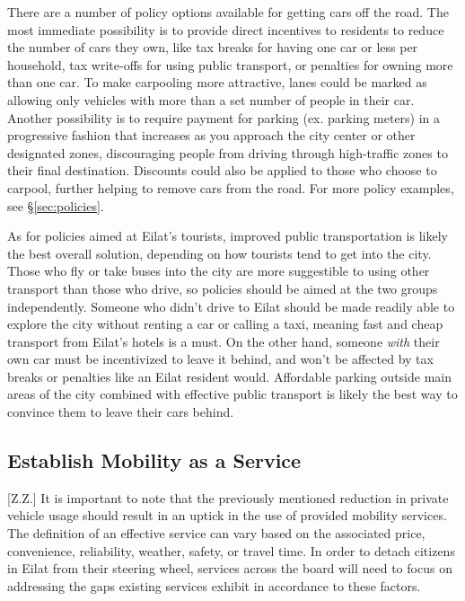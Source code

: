 \documentclass[12pt]{article}                       %
\begin{document}
There are a number of policy options available for getting cars off the road. The most immediate possibility is to provide direct incentives to residents to reduce the number of cars they own, like tax breaks for having one car or less per household, tax write-offs for using public transport, or penalties for owning more than one car. To make carpooling more attractive, lanes could be marked as allowing only vehicles with more than a set number of people in their car. Another possibility is to require payment for parking (ex. parking meters) in a progressive fashion that increases as you approach the city center or other designated zones, discouraging people from driving through high-traffic zones to their final destination. Discounts could also be applied to those who choose to carpool, further helping to remove cars from the road. For more policy examples, see \S\ref{sec:policies}.

As for policies aimed at Eilat's tourists, improved public transportation is likely the best overall solution, depending on how tourists tend to get into the city. Those who fly or take buses into the city are more suggestible to using other transport than those who drive, so policies should be aimed at the two groups independently. Someone who didn't drive to Eilat should be made readily able to explore the city without renting a car or calling a taxi, meaning fast and cheap transport from Eilat's hotels is a must. On the other hand, someone \textit{with} their own car must be incentivized to leave it behind, and won't be affected by tax breaks or penalties like an Eilat resident would. Affordable parking outside main areas of the city combined with effective public transport is likely the best way to convince them to leave their cars behind.

\subsection{Establish Mobility as a Service}[Z.Z.]    
It is important to note that the previously mentioned reduction in private vehicle usage should result in an uptick in the use of provided mobility services. The definition of an effective service can vary based on the associated price, convenience, reliability, weather, safety, or travel time. In order to detach citizens in Eilat from their steering wheel, services across the board will need to focus on addressing the gaps existing services exhibit in accordance to these factors. 
\end{document}
